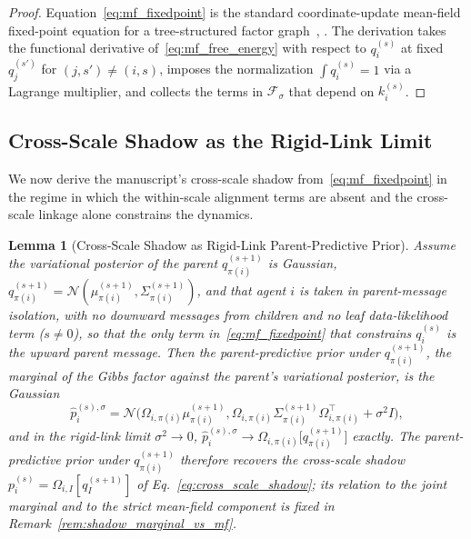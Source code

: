 \documentclass[11pt]{article}
\newtheorem{lemma}{Lemma}
\begin{document}
\begin{proof}
Equation~\eqref{eq:mf_fixedpoint} is the standard coordinate-update mean-field fixed-point equation for a tree-structured factor graph~\cite[Prop.~4.1]{Wainwright2008}, \cite[\S10.1]{Bishop2006}. The derivation takes the functional derivative of~\eqref{eq:mf_free_energy} with respect to $q_i^{(s)}$ at fixed $q_{j}^{(s')}$ for $(j, s') \neq (i, s)$, imposes the normalization $\int q_i^{(s)} = 1$ via a Lagrange multiplier, and collects the terms in $\mathcal{F}_{\sigma}$ that depend on $k_i^{(s)}$.
\end{proof}

\subsection{Cross-Scale Shadow as the Rigid-Link Limit}

We now derive the manuscript's cross-scale shadow from~\eqref{eq:mf_fixedpoint} in the regime in which the within-scale alignment terms are absent and the cross-scale linkage alone constrains the dynamics.

\begin{lemma}[Cross-Scale Shadow as Rigid-Link Parent-Predictive Prior]
\label{lem:shadow_mf_optimum}
Assume the variational posterior of the parent $q_{\pi(i)}^{(s+1)}$ is Gaussian, $q_{\pi(i)}^{(s+1)} = \mathcal{N}(\mu_{\pi(i)}^{(s+1)}, \Sigma_{\pi(i)}^{(s+1)})$, and that agent $i$ is taken in parent-message isolation, with no downward messages from children and no leaf data-likelihood term ($s \neq 0$), so that the only term in~\eqref{eq:mf_fixedpoint} that constrains $q_i^{(s)}$ is the upward parent message. Then the parent-predictive prior under $q_{\pi(i)}^{(s+1)}$, the marginal of the Gibbs factor against the parent's variational posterior, is the Gaussian
\begin{equation}
\hat{p}_i^{(s),\sigma}  =  \mathcal{N}\big(\Omega_{i,\pi(i)} \mu_{\pi(i)}^{(s+1)}, \Omega_{i,\pi(i)} \Sigma_{\pi(i)}^{(s+1)} \Omega_{i,\pi(i)}^\top + \sigma^2 I\big),
\label{eq:shadow_soft}
\end{equation}
and in the rigid-link limit $\sigma^2 \to 0$, $\hat{p}_i^{(s),\sigma} \to \Omega_{i,\pi(i)}\big[q_{\pi(i)}^{(s+1)}\big]$ exactly. The parent-predictive prior under $q_{\pi(i)}^{(s+1)}$ therefore recovers the cross-scale shadow $p_i^{(s)} = \Omega_{i,I}[q_I^{(s+1)}]$ of Eq.~\eqref{eq:cross_scale_shadow}; its relation to the joint marginal and to the strict mean-field component is fixed in Remark~\ref{rem:shadow_marginal_vs_mf}.
\end{lemma}
\end{document}
